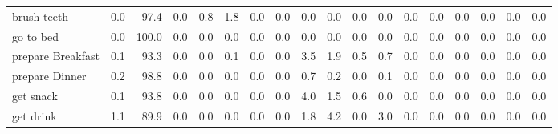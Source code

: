 \documentclass{article}
\begin{document}
\begin{sideways}
\begin{tabular}{lrrrrrrrrrrrrrrrrr}
brush teeth                   &         0.0 &               97.4 &           0.0 &               0.8 &                1.8 &                0.0 &              0.0 &                      0.0 &                   0.0 &              0.0 &              0.0 &                            0.0 &                      0.0 &                    0.0 &                                  0.0 &                          0.0 &                  0.0 \\
go to bed                     &         0.0 &              100.0 &           0.0 &               0.0 &                0.0 &                0.0 &              0.0 &                      0.0 &                   0.0 &              0.0 &              0.0 &                            0.0 &                      0.0 &                    0.0 &                                  0.0 &                          0.0 &                  0.0 \\
prepare Breakfast             &         0.1 &               93.3 &           0.0 &               0.0 &                0.1 &                0.0 &              0.0 &                      3.5 &                   1.9 &              0.5 &              0.7 &                            0.0 &                      0.0 &                    0.0 &                                  0.0 &                          0.0 &                  0.0 \\
prepare Dinner                &         0.2 &               98.8 &           0.0 &               0.0 &                0.0 &                0.0 &              0.0 &                      0.7 &                   0.2 &              0.0 &              0.1 &                            0.0 &                      0.0 &                    0.0 &                                  0.0 &                          0.0 &                  0.0 \\
get snack                     &         0.1 &               93.8 &           0.0 &               0.0 &                0.0 &                0.0 &              0.0 &                      4.0 &                   1.5 &              0.6 &              0.0 &                            0.0 &                      0.0 &                    0.0 &                                  0.0 &                          0.0 &                  0.0 \\
get drink                     &         1.1 &               89.9 &           0.0 &               0.0 &                0.0 &                0.0 &              0.0 &                      1.8 &                   4.2 &              0.0 &              3.0 &                            0.0 &                      0.0 &                    0.0 &                                  0.0 &                          0.0 &                  0.0 \\

\end{tabular}
\end{sideways}
\end{document}
